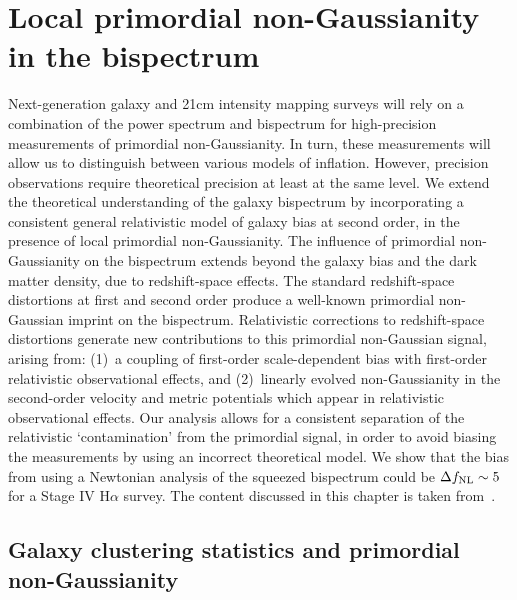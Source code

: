 
\chapter{Local primordial non-Gaussianity in the bispectrum}
\label{chapter:localpng}


Next-generation galaxy and 21cm intensity mapping surveys will rely on a combination of the power spectrum and bispectrum for high-precision measurements of primordial non-Gaussianity. In turn, these measurements will allow us to distinguish between various models of inflation. However, precision observations require theoretical precision at least at the same level. We extend the theoretical understanding of the galaxy bispectrum by incorporating a consistent general relativistic model of galaxy bias at second order, in the presence of local primordial non-Gaussianity. {The influence of primordial non-Gaussianity on the bispectrum extends beyond the  galaxy bias and the dark matter density, due to redshift-space effects. The standard redshift-space distortions at first and second order produce a well-known primordial non-Gaussian  imprint on the bispectrum. Relativistic corrections to redshift-space distortions
generate new contributions to this primordial non-Gaussian signal, arising from: (1)~a coupling of first-order scale-dependent bias with first-order relativistic observational effects, and (2)~linearly evolved non-Gaussianity in the second-order velocity and metric potentials which appear in relativistic observational effects.}
Our analysis allows for a consistent separation of the relativistic  `contamination' from the primordial signal, in order to avoid biasing the measurements by using an incorrect theoretical model. We show that the bias from using a Newtonian analysis of the squeezed bispectrum could be $\Delta f_\text{NL}\sim 5$ for a Stage IV H$\alpha$ survey. The content discussed in this chapter is taken from~\cite{Maartens:2020jzf}.

\section{Galaxy clustering statistics and primordial non-Gaussianity}

